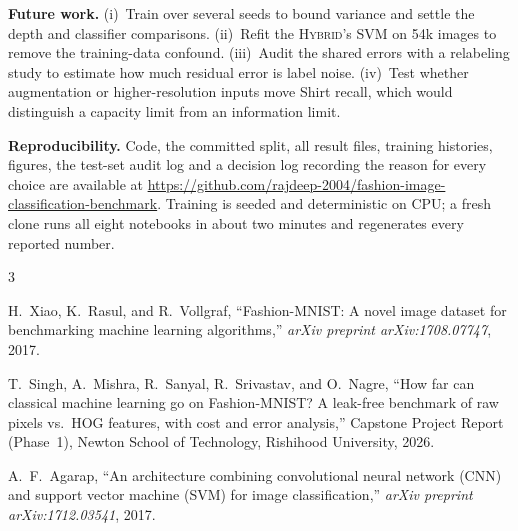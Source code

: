 \documentclass[conference]{IEEEtran}
\newcommand{\hyb}{\textsc{Hybrid}}           %
\begin{document}
\textbf{Future work.} (i)~Train over several seeds to bound variance and settle the depth and classifier comparisons.
(ii)~Refit the \hyb{}'s SVM on 54k images to remove the training-data confound. (iii)~Audit the shared errors with
a relabeling study to estimate how much residual error is label noise. (iv)~Test whether
augmentation or higher-resolution inputs move Shirt recall, which would distinguish a capacity limit from an information
limit.

\textbf{Reproducibility.} Code, the committed split, all result files, training histories, figures, the test-set audit
log and a decision log recording the reason for every choice are available at
\url{https://github.com/rajdeep-2004/fashion-image-classification-benchmark}. Training is seeded and deterministic on CPU;
a fresh clone runs all eight notebooks in about two minutes and regenerates every reported number.

\begin{thebibliography}{3}

H.~Xiao, K.~Rasul, and R.~Vollgraf, ``Fashion-MNIST: A novel image dataset for benchmarking machine learning
algorithms,'' \emph{arXiv preprint arXiv:1708.07747}, 2017.

T.~Singh, A.~Mishra, R.~Sanyal, R.~Srivastav, and O.~Nagre, ``How far can classical machine learning go on
Fashion-MNIST? A leak-free benchmark of raw pixels vs.\ HOG features, with cost and error analysis,'' Capstone Project
Report (Phase~1), Newton School of Technology, Rishihood University, 2026.

A.~F.~Agarap, ``An architecture combining convolutional neural network (CNN) and support vector machine (SVM) for
image classification,'' \emph{arXiv preprint arXiv:1712.03541}, 2017.

\end{thebibliography}
\end{document}
